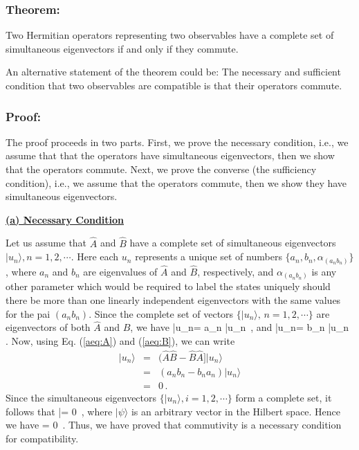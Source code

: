 \subsubsection{Theorem: }
Two Hermitian operators representing two observables have a complete set of simultaneous eigenvectors if and only if they commute.

\noindent An alternative statement of the theorem could be: The necessary and sufficient condition that two observables are compatible is that their operators commute.

\subsubsection{Proof:}
The proof proceeds in two parts. First, we prove the necessary condition, i.e., we assume that that the operators have simultaneous eigenvectors, then we show that the operators commute. Next, we prove the converse (the sufficiency condition), i.e., we assume that
the operators commute, then we show they have simultaneous eigenvectors.

\newpage
\noindent
{\bf {\underline {(a) Necessary Condition}}}

Let us assume that $\hat{A}$ and $\hat{B}$ have a complete set of simultaneous eigenvectors $|u_n\rangle, n =1,2, \cdots$. Here each $u_n$ represents a unique set of numbers
 $\{a_n,b_n,\alpha_{(a_nb_n)}\}$, where $a_n$ and $b_n$ are eigenvalues of $\hat{A}$ and $\hat{B}$, respectively, and $\alpha_{(a_nb_n)}$ is any other parameter which would be required to label the states uniquely should there be more than one linearly independent eigenvectors with the same values for the pai $(a_nb_n)$. Since the complete set of vectors 
$\{|u_n\rangle,\, n= 1,2, \cdots\}$ are eigenvectors of both
$\hat{A}$ and $\hat{B}$, we have
\be
{}|u_n\rangle = a_n |u_n\rangle\, ,
\label{aeq:A}
\ee
and
\be
{}|u_n\rangle = b_n |u_n\rangle\, .
\label{aeq:B}
\ee
Now, using Eq. (\ref{aeq:A}) and (\ref{aeq:B}), we can write
\begin{eqnarray}
[\hat{A},\hat{B}]|u_n\rangle &= & (\hat{A}\hat{B}-\hat{B}\hat{A}]|u_n\rangle \nonumber \\
                             &=& (a_nb_n-b_na_n)|u_n\rangle \nonumber \\
														 & = & 0\,.
\end{eqnarray}
Since the simultaneous eigenvectors $\{|u_n\rangle, i= 1,2, \cdots\}$ form a complete set, it follows that
|\psi\rangle = 0\, ,
\ee
where $|\psi\rangle$ is an arbitrary vector in the Hilbert space. Hence we have
 = 0\, .
\ee
Thus, we have proved that commutivity is a necessary condition for compatibility.


